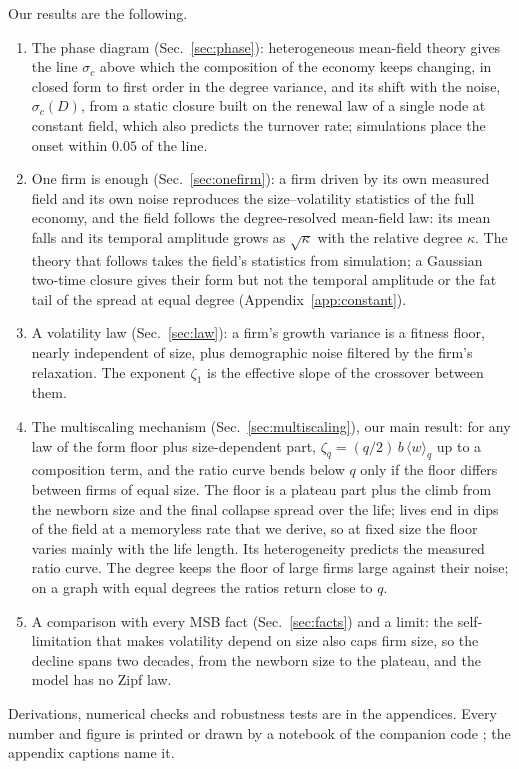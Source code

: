 \documentclass[pre,twocolumn,superscriptaddress,nofootinbib]{revtex4-2}
\begin{document}
Our results are the following.
\begin{enumerate}
\item The phase diagram (Sec.~\ref{sec:phase}): heterogeneous mean-field theory gives the line
  $\sigma_c$ above which the composition of the economy keeps changing, in closed form to first
  order in the degree variance, and its shift with the noise, $\sigma_c(D)$, from a static closure
  built on the renewal law of a single node at constant field, which also predicts the turnover rate;
  simulations place the onset within $0.05$ of the line.
\item One firm is enough (Sec.~\ref{sec:onefirm}): a firm driven by its own measured field and its own
  noise reproduces the size--volatility statistics of the full economy, and the field follows
  the degree-resolved mean-field law: its mean falls and its temporal amplitude grows as $\sqrt\kappa$ with
  the relative degree $\kappa$.  The theory that follows takes the field's statistics from simulation; a
  Gaussian two-time closure gives their form but not the temporal amplitude or the fat tail of the spread
  at equal degree (Appendix~\ref{app:constant}).
\item A volatility law (Sec.~\ref{sec:law}): a firm's growth variance is a fitness floor, nearly
  independent of size, plus demographic noise filtered by the firm's relaxation.  The exponent
  $\zeta_1$ is the effective slope of the crossover between them.
\item The multiscaling mechanism (Sec.~\ref{sec:multiscaling}), our main result: for any law of the
  form floor plus size-dependent part, $\zeta_q=(q/2)\,b\,\langle w\rangle_q$ up to a composition term, and the ratio curve
  bends below $q$ only if the floor differs between firms of equal size.  The floor is a plateau
  part plus the climb from the newborn size and the final collapse spread over the life; lives end in
  dips of the field at a memoryless rate that we derive, so at fixed size the floor varies mainly with the
  life length.  Its heterogeneity predicts the measured ratio curve.  The degree keeps the floor of
  large firms large against their noise; on a graph with equal degrees the ratios return close to $q$.
\item A comparison with every MSB fact (Sec.~\ref{sec:facts}) and a limit: the
  self-limitation that makes volatility depend on size also caps firm size, so the decline spans two
  decades, from the newborn size to the plateau, and the model has no Zipf law.
\end{enumerate}
Derivations, numerical checks and robustness tests are in the appendices.  Every number and figure
is printed or drawn by a notebook of the companion code \cite{code}; the appendix captions name it.
\end{document}
